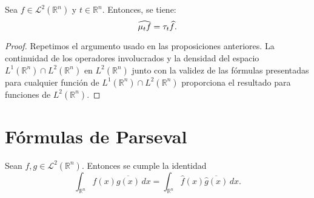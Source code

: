 \begin{proposicion}
    Sea $f \in \mathscr{L}^2(\mathbb{R}^n)$ y $t \in \mathbb{R}^n$. Entonces, se tiene:
    \begin{equation*}
        \widehat{\mu_tf} = \tau_t\widehat{f}. \qedhere
    \end{equation*}
\end{proposicion}

\begin{proof}
Repetimos el argumento usado en las proposiciones anteriores. La continuidad de los operadores involucrados y la densidad del espacio $L^1(\mathbb{R}^n) \cap L^2(\mathbb{R}^n)$ en $L^2(\mathbb{R}^n)$ junto con la validez de las fórmulas presentadas para cualquier función de $L^1(\mathbb{R}^n) \cap L^2(\mathbb{R}^n)$ proporciona el resultado para funciones de  $L^2(\mathbb{R}^n)$.

\end{proof}


\section{Fórmulas de Parseval}
\begin{proposicion}\label{teo:parse}
Sean $f,g \in \mathscr{L}^2(\mathbb{R}^n)$. Entonces se cumple la identidad
\begin{equation}\label{eq:parseval}
    \int_{\mathbb{R}^n} f(x) \overline{g(x)} \, dx = \int_{\mathbb{R}^n} \widehat{f}(x) \overline{\widehat{g}(x)}\, dx.
\end{equation}
\end{proposicion}

